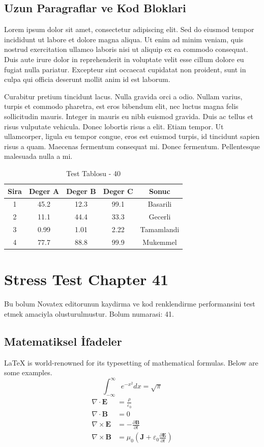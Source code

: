 \documentclass[12pt,a4paper]{article}
\begin{document}
\subsection{Uzun Paragraflar ve Kod Bloklari}
Lorem ipsum dolor sit amet, consectetur adipiscing elit. Sed do eiusmod tempor incididunt ut labore et dolore magna aliqua. Ut enim ad minim veniam, quis nostrud exercitation ullamco laboris nisi ut aliquip ex ea commodo consequat. Duis aute irure dolor in reprehenderit in voluptate velit esse cillum dolore eu fugiat nulla pariatur. Excepteur sint occaecat cupidatat non proident, sunt in culpa qui officia deserunt mollit anim id est laborum.

Curabitur pretium tincidunt lacus. Nulla gravida orci a odio. Nullam varius, turpis et commodo pharetra, est eros bibendum elit, nec luctus magna felis sollicitudin mauris. Integer in mauris eu nibh euismod gravida. Duis ac tellus et risus vulputate vehicula. Donec lobortis risus a elit. Etiam tempor. Ut ullamcorper, ligula eu tempor congue, eros est euismod turpis, id tincidunt sapien risus a quam. Maecenas fermentum consequat mi. Donec fermentum. Pellentesque malesuada nulla a mi.

\begin{table}[h!]
\centering
\begin{tabular}{|c|c|c|c|c|}
\hline
\textbf{Sira} & \textbf{Deger A} & \textbf{Deger B} & \textbf{Deger C} & \textbf{Sonuc} \\
\hline
1 & 45.2 & 12.3 & 99.1 & Basarili \\
2 & 11.1 & 44.4 & 33.3 & Gecerli \\
3 & 0.99 & 1.01 & 2.22 & Tamamlandi \\
4 & 77.7 & 88.8 & 99.9 & Mukemmel \\
\hline
\end{tabular}
\caption{Test Tablosu - 40}
\end{table}

\newpage
\section{Stress Test Chapter 41}
Bu bolum Novatex editorunun kaydirma ve kod renklendirme performansini test etmek amaciyla olusturulmustur. Bolum numarasi: 41.

\subsection{Matematiksel İfadeler}
\LaTeX{} is world-renowned for its typesetting of mathematical formulas. Below are some examples.
\begin{equation}
\int_{-\infty}^{\infty} e^{-x^2} dx = \sqrt{\pi}
\end{equation}
\begin{align}
\nabla \cdot \mathbf{E} &= \frac{\rho}{\varepsilon_0} \\
\nabla \cdot \mathbf{B} &= 0 \\
\nabla \times \mathbf{E} &= -\frac{\partial \mathbf{B}}{\partial t} \\
\nabla \times \mathbf{B} &= \mu_0\left(\mathbf{J} + \varepsilon_0 \frac{\partial \mathbf{E}}{\partial t}\right)
\end{align}
\end{document}
